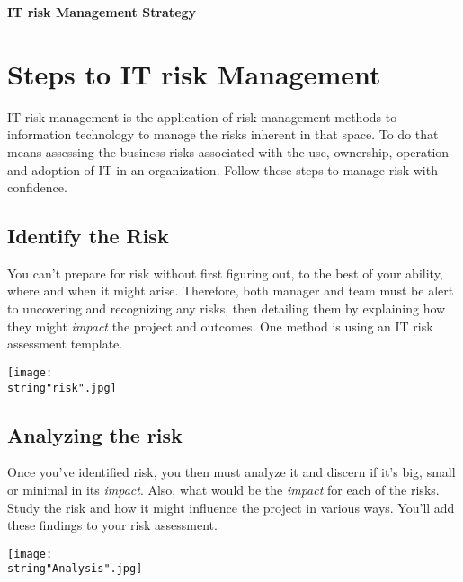 \documentclass[a4paper,12pt]{article}
\begin{document}
\textbf{IT risk Management Strategy}

\tableofcontents
\clearpage
 
\section{Steps to IT risk Management}

IT risk management is the application of risk management methods to information technology to manage the risks inherent in that space. To do that means assessing the business risks associated with the use, ownership, operation and adoption of IT in an organization. Follow these steps to manage risk with confidence.

\subsection{Identify the Risk}
You can’t prepare for risk without first figuring out, to the best of your ability, where and when it might arise. Therefore, both manager and team must be alert to uncovering and recognizing any risks, then detailing them by explaining how they might \emph{impact} the project and outcomes. One method is using an IT risk assessment template.


\begin{center}
\vspace*{\fill}\texttt{[image: \\string"risk".jpg]}\vspace*{\fill}
\par\end{center}



\subsection{Analyzing the risk}
Once you’ve identified risk, you then must analyze it and discern if it’s big, small or minimal in its \emph{impact}. Also, what would be the \emph{impact} for each of the risks. Study the risk and how it might influence the project in various ways. You’ll add these findings to your risk assessment.



\begin{center}
\vspace*{\fill}\texttt{[image: \\string"Analysis".jpg]}\vspace*{\fill}
\par\end{center}
\end{document}
